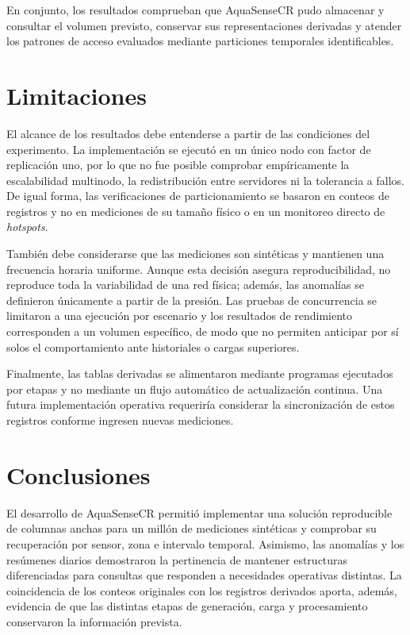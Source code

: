 \documentclass[conference]{IEEEtran}
\begin{document}
En conjunto, los resultados comprueban que AquaSenseCR pudo almacenar y consultar el volumen previsto, conservar sus representaciones derivadas y atender los patrones de acceso evaluados mediante particiones temporales identificables.

\section{Limitaciones}

El alcance de los resultados debe entenderse a partir de las condiciones del experimento. La implementación se ejecutó en un único nodo con factor de replicación uno, por lo que no fue posible comprobar empíricamente la escalabilidad multinodo, la redistribución entre servidores ni la tolerancia a fallos. De igual forma, las verificaciones de particionamiento se basaron en conteos de registros y no en mediciones de su tamaño físico o en un monitoreo directo de \textit{hotspots}.

También debe considerarse que las mediciones son sintéticas y mantienen una frecuencia horaria uniforme. Aunque esta decisión asegura reproducibilidad, no reproduce toda la variabilidad de una red física; además, las anomalías se definieron únicamente a partir de la presión. Las pruebas de concurrencia se limitaron a una ejecución por escenario y los resultados de rendimiento corresponden a un volumen específico, de modo que no permiten anticipar por sí solos el comportamiento ante historiales o cargas superiores.

Finalmente, las tablas derivadas se alimentaron mediante programas ejecutados por etapas y no mediante un flujo automático de actualización continua. Una futura implementación operativa requeriría considerar la sincronización de estos registros conforme ingresen nuevas mediciones.

\section{Conclusiones}

El desarrollo de AquaSenseCR permitió implementar una solución reproducible de columnas anchas para un millón de mediciones sintéticas y comprobar su recuperación por sensor, zona e intervalo temporal. Asimismo, las anomalías y los resúmenes diarios demostraron la pertinencia de mantener estructuras diferenciadas para consultas que responden a necesidades operativas distintas. La coincidencia de los conteos originales con los registros derivados aporta, además, evidencia de que las distintas etapas de generación, carga y procesamiento conservaron la información prevista.
\end{document}

